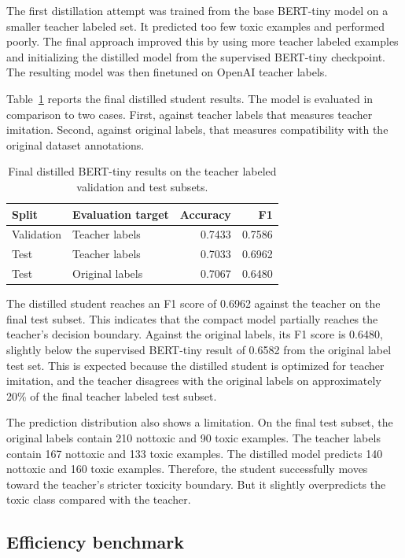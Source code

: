 \documentclass[pdflatex,sn-mathphys-num]{sn-jnl}
\begin{document}
The first distillation attempt was trained from the base BERT-tiny model on a smaller teacher labeled set.
It predicted too few toxic examples and performed poorly. 
The final approach improved this by using more teacher labeled examples and initializing the distilled model from the supervised BERT-tiny checkpoint. 
The resulting model was then finetuned on OpenAI teacher labels.

Table~\ref{tab:distilled-results} reports the final distilled student results.
The model is evaluated in comparison to two cases.
First, against teacher labels that measures teacher imitation.
Second, against original labels, that measures compatibility with the original dataset annotations.

\begin{table}[h]
\caption{Final distilled BERT-tiny results on the teacher labeled validation and test subsets.}\label{tab:distilled-results}
\centering
\begin{tabular}{llrr}
\toprule
Split & Evaluation target & Accuracy & F1 \\
\midrule
Validation & Teacher labels & 0.7433 & 0.7586 \\
Test & Teacher labels & 0.7033 & 0.6962 \\
Test & Original labels & 0.7067 & 0.6480 \\
\bottomrule
\end{tabular}
\end{table}

The distilled student reaches an F1 score of 0.6962 against the teacher on the final test subset.
This indicates that the compact model partially reaches the teacher's decision boundary.
Against the original labels, its F1 score is 0.6480, slightly below the supervised BERT-tiny result of 0.6582 from the original label test set.
This is expected because the distilled student is optimized for teacher imitation, and the teacher disagrees with the original labels on approximately 20\% of the final teacher labeled test subset.

The prediction distribution also shows a limitation.
On the final test subset, the original labels contain 210 nottoxic and 90 toxic examples.
The teacher labels contain 167 nottoxic and 133 toxic examples.
The distilled model predicts 140 nottoxic and 160 toxic examples.
Therefore, the student successfully moves toward the teacher's stricter toxicity boundary.
But it slightly overpredicts the toxic class compared with the teacher.

\subsection{Efficiency benchmark}
\end{document}
